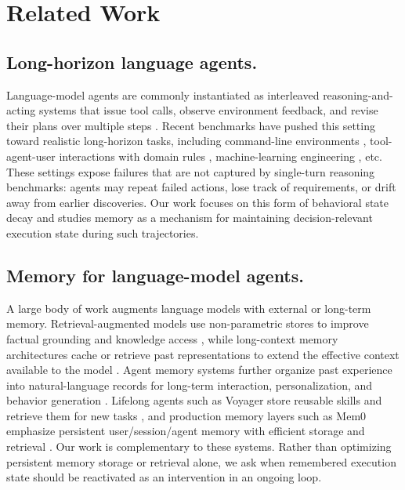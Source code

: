 \section{Related Work}

\subsection{Long-horizon language agents.}
Language-model agents are commonly instantiated as interleaved reasoning-and-acting systems that issue tool calls, observe environment feedback, and revise their plans over multiple steps \citep{yao2023react}. Recent benchmarks have pushed this setting toward realistic long-horizon tasks, including command-line environments \citep{merrill2026terminalbench}, tool-agent-user interactions with domain rules \citep{yao2024taubench}, machine-learning engineering \citep{chan2024mlebench}, etc. These settings expose failures that are not captured by single-turn reasoning benchmarks: agents may repeat failed actions, lose track of requirements, or drift away from earlier discoveries. Our work focuses on this form of behavioral state decay and studies memory as a mechanism for maintaining decision-relevant execution state during such trajectories.

\subsection{Memory for language-model agents.}
A large body of work augments language models with external or long-term memory. Retrieval-augmented models use non-parametric stores to improve factual grounding and knowledge access \citep{guu2020realm,lewis2020rag}, while long-context memory architectures cache or retrieve past representations to extend the effective context available to the model \citep{wang2023longmem}. Agent memory systems further organize past experience into natural-language records for long-term interaction, personalization, and behavior generation \citep{park2023generative,zhong2024memorybank,packer2023memgpt,zhang2024memorysurvey}. Lifelong agents such as Voyager store reusable skills and retrieve them for new tasks \citep{wang2024voyager}, and production memory layers such as Mem0 emphasize persistent user/session/agent memory with efficient storage and retrieval \citep{mem0ai2026mem0}. Our work is complementary to these systems. Rather than optimizing persistent memory storage or retrieval alone, we ask when remembered execution state should be reactivated as an intervention in an ongoing loop.

